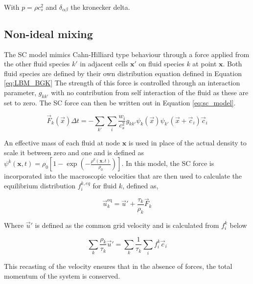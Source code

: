 With $p = \rho c_s^2$ and $\delta_{\alpha \beta}$ the kronecker delta.

\subsection{Non-ideal mixing}
\label{section:lbm_non_ideal_mixing}

The SC model mimics Cahn-Hilliard type behaviour through a force applied from the other fluid species $k'$ in adjacent 
cells $\mathbf{x'}$ on fluid species $k$ at point $\mathbf{x}$. \cite{shan_lattice_1993, shan_simulation_1994, 
shan_multicomponent_1995, he_discrete_1998, jansen_bijels_2011, chin_lattice_2002} Both fluid species are defined
by their own distribution equation defined in Equation \ref{eq:LBM_BGK} The strength of this force is controlled 
through an interaction parameter, $g_{kk'}$ with no contribution from self interaction of the fluid as these are 
set to zero. The SC force can then be written out in Equation \ref{eq:sc_model}.

\begin{equation}
\vec{F}_k(\vec{x}) \Delta t = - \sum_{k'} \sum_i \frac{w_i}{c_s^2} g_{kk'} \psi_k(\vec{x})\psi_{k'}(\vec{x}+\vec{c}_i) \vec{c}_i
\label{eq:sc_model}
\end{equation}

An effective mass of each fluid at node $\mathbf{x}$ is used in place of the actual density to scale it between zero 
and one and is defined as $\psi^{k}(\mathbf{x},t) = \rho_{0}\left[1 - \exp(-\frac{\rho^{k}(\mathbf{x}, t)}{\rho_{0}})\right]$. 
In this model, the SC force is incorporated into the macroscopic velocities that are then used to calculate the equilibrium
distribution $f_{i}^{k, eq}$ for fluid $k$, defined as,

\begin{equation}
\vec{u}_k^{\text{eq}} = \vec{u}' + \frac{\tau_k}{\rho_k} \vec{F}_k
\end{equation}

Where $\vec{u}'$ is defined as the common grid velocity and is calculated from $f_i^k$ below

\begin{equation}
    \sum_k \frac{\rho_k}{\tau_k} \vec{u}' = \sum_k \frac{1}{\tau_k}\sum_i f_i^k\vec{c}_i
\end{equation}

This recasting of the velocity ensures that in the absence of forces, the total momentum of the system is conserved. 

